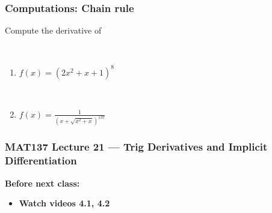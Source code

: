 \documentclass[14pt]{beamer}
\newcommand {\DS} [1] {${\displaystyle #1}$}
\begin{document}
\begin{frame}[t]
\frametitle{Computations: Chain rule}

Compute the derivative of 

\

\begin{enumerate}
	\item  \DS{f(x) = \left( 2x^2+x+1 \right)^{8} }


\
	
	\item \DS{f(x) = \frac{1}{\left( x + \sqrt{x^2+x}  \right)^{137}}  }

\end{enumerate}

\end{frame}














\begin{frame}
	\frametitle{MAT137 Lecture 21 --- Trig Derivatives and Implicit Differentiation}

	\vfill
	{\bf Before next class:}
		\begin{itemize} \normalsize
			\item {\bf Watch videos 4.1, 4.2 }
		\end{itemize}
\end{frame}

















\end{document}
